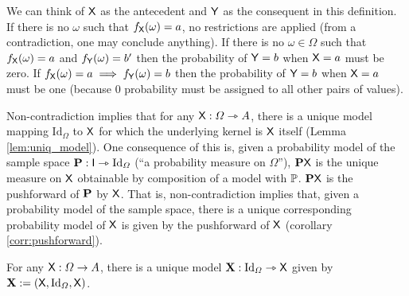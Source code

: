 We can think of $\mathsf{X}$ as the antecedent and $\mathsf{Y}$ as the consequent in this definition. If there is no $\omega$ such that $f_{\mathsf{X}}(\omega)=a$, no restrictions are applied (from a contradiction, one may conclude anything). If there is no $\omega\in \Omega$ such that $f_{\mathsf{X}}(\omega)=a$ and $f_{\mathsf{Y}}(\omega)={b'}$ then the probability of $\mathsf{Y}=b$ when $\mathsf{X}=a$ must be zero. If $f_{\mathsf{X}}(\omega)=a\implies f_{\mathsf{Y}}(\omega)=b$ then the probability of $\mathsf{Y}=b$ when $\mathsf{X}=a$ must be one (because 0 probability must be assigned to all other pairs of values).

Non-contradiction implies that for any $\mathsf{X}:\Omega\rightarrowtriangle A$, there is a unique model mapping $\text{Id}_\Omega$ to $\mathsf{X}$ for which the underlying kernel is $\mathsf{X}$ itself (Lemma \ref{lem:uniq_model}). One consequence of this is, given a probability model of the sample space $\mathbf{P}:\mathsf{I}\rightarrowtriangle \text{Id}_\Omega$ (``a probability measure on $\Omega$''), $\mathbf{P}\mathsf{X}$ is the unique measure on $\mathsf{X}$ obtainable by composition of a model with $\mathbb{P}$. $\mathbf{P}\mathsf{X}$ is the pushforward of $\mathbf{P}$ by $\mathsf{X}$. That is, non-contradiction implies that, given a probability model of the sample space, there is a unique corresponding probability model of $\mathsf{X}$ is given by the pushforward of $\mathsf{X}$ (corollary \ref{corr:pushforward}).

\begin{lemma}\label{lem:uniq_model}
For any $\mathsf{X}:\Omega\to A$, there is a unique model $\mathbf{X}:\text{Id}_\Omega\rightarrowtriangle \mathsf{X}$ given by $\mathbf{X}:=(\mathsf{X},\text{Id}_\Omega,\mathsf{X})$.
\end{lemma}

